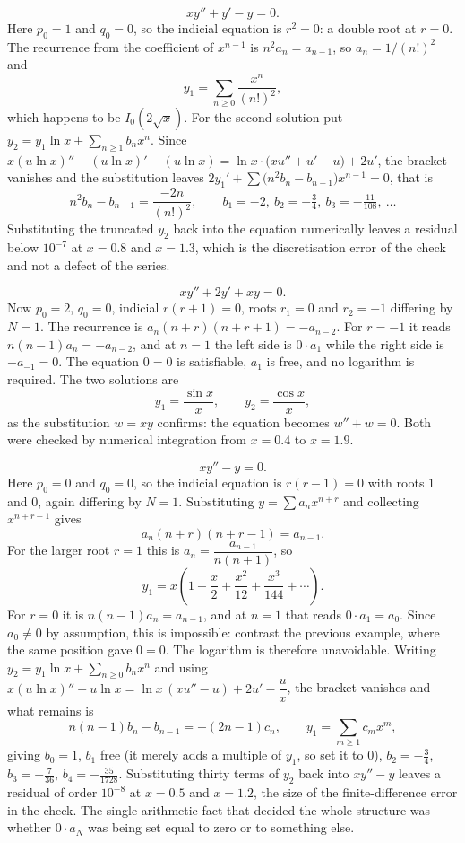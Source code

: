 \begin{worked}
\[xy''+y'-y=0.\]
Here $p_0=1$ and $q_0=0$, so the indicial equation is $r^{2}=0$: a double root at $r=0$. The recurrence from the coefficient of $x^{n-1}$ is $n^{2}a_n=a_{n-1}$, so $a_n=1/(n!)^{2}$ and
\[y_1=\sum_{n\ge0}\frac{x^{n}}{(n!)^{2}},\]
which happens to be $I_0(2\sqrt x)$. For the second solution put $y_2=y_1\ln x+\sum_{n\ge1}b_nx^{n}$. Since $x(u\ln x)''+(u\ln x)'-(u\ln x)=\ln x\cdot\bigl(xu''+u'-u\bigr)+2u'$, the bracket vanishes and the substitution leaves $2y_1'+\sum\bigl(n^{2}b_n-b_{n-1}\bigr)x^{n-1}=0$, that is
\[n^{2}b_n-b_{n-1}=\frac{-2n}{(n!)^{2}},\qquad b_1=-2,\ b_2=-\tfrac34,\ b_3=-\tfrac{11}{108},\ \dots\]
Substituting the truncated $y_2$ back into the equation numerically leaves a residual below $10^{-7}$ at $x=0.8$ and $x=1.3$, which is the discretisation error of the check and not a defect of the series.
\end{worked}

\begin{worked}
\[xy''+2y'+xy=0.\]
Now $p_0=2$, $q_0=0$, indicial $r(r+1)=0$, roots $r_1=0$ and $r_2=-1$ differing by $N=1$. The recurrence is $a_n(n+r)(n+r+1)=-a_{n-2}$. For $r=-1$ it reads $n(n-1)a_n=-a_{n-2}$, and at $n=1$ the left side is $0\cdot a_1$ while the right side is $-a_{-1}=0$. The equation $0=0$ is satisfiable, $a_1$ is free, and no logarithm is required. The two solutions are
\[y_1=\frac{\sin x}{x},\qquad y_2=\frac{\cos x}{x},\]
as the substitution $w=xy$ confirms: the equation becomes $w''+w=0$. Both were checked by numerical integration from $x=0.4$ to $x=1.9$.
\end{worked}

\begin{worked}
\[xy''-y=0.\]
Here $p_0=0$ and $q_0=0$, so the indicial equation is $r(r-1)=0$ with roots $1$ and $0$, again differing by $N=1$. Substituting $y=\sum a_nx^{n+r}$ and collecting $x^{n+r-1}$ gives
\[a_n(n+r)(n+r-1)=a_{n-1}.\]
For the larger root $r=1$ this is $a_n=\dfrac{a_{n-1}}{n(n+1)}$, so
\[y_1=x\left(1+\frac x2+\frac{x^{2}}{12}+\frac{x^{3}}{144}+\cdots\right).\]
For $r=0$ it is $n(n-1)a_n=a_{n-1}$, and at $n=1$ that reads $0\cdot a_1=a_0$. Since $a_0\ne0$ by assumption, this is impossible: contrast the previous example, where the same position gave $0=0$. The logarithm is therefore unavoidable. Writing $y_2=y_1\ln x+\sum_{n\ge0}b_nx^{n}$ and using $x(u\ln x)''-u\ln x=\ln x\,(xu''-u)+2u'-\dfrac ux$, the bracket vanishes and what remains is
\[n(n-1)b_n-b_{n-1}=-(2n-1)c_n,\qquad y_1=\sum_{m\ge1}c_mx^{m},\]
giving $b_0=1$, $b_1$ free (it merely adds a multiple of $y_1$, so set it to $0$), $b_2=-\tfrac34$, $b_3=-\tfrac7{36}$, $b_4=-\tfrac{35}{1728}$. Substituting thirty terms of $y_2$ back into $xy''-y$ leaves a residual of order $10^{-8}$ at $x=0.5$ and $x=1.2$, the size of the finite-difference error in the check. The single arithmetic fact that decided the whole structure was whether $0\cdot a_N$ was being set equal to zero or to something else.
\end{worked}

